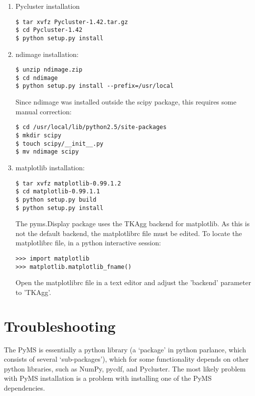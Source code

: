 \begin{enumerate}
\item Pycluster installation

\begin{verbatim}
$ tar xvfz Pycluster-1.42.tar.gz
$ cd Pycluster-1.42
$ python setup.py install
\end{verbatim}

\item ndimage installation:

\begin{verbatim}
$ unzip ndimage.zip
$ cd ndimage
$ python setup.py install --prefix=/usr/local
\end{verbatim}

\noindent
Since ndimage was installed outside the scipy package, this requires some manual
correction:

\begin{verbatim}
$ cd /usr/local/lib/python2.5/site-packages
$ mkdir scipy
$ touch scipy/__init__.py
$ mv ndimage scipy
\end{verbatim}

\item matplotlib installation:

\begin{verbatim}
$ tar xvfz matplotlib-0.99.1.2
$ cd matplotlib-0.99.1.1
$ python setup.py build
$ python setup.py install
\end{verbatim}

\noindent
The pyms.Display package uses the TKAgg backend for matplotlib. As this is
not the default backend, the matplotlibrc file must be edited. To locate the
matplotlibrc file, in a python interactive session:

\begin{verbatim}
>>> import matplotlib
>>> matplotlib.matplotlib_fname()
\end{verbatim}

\noindent
Open the matplotlibrc file in a text editor and adjust the 'backend'
parameter to 'TKAgg'.

\end{enumerate}

\section{Troubleshooting}

The PyMS is essentially a python library (a `package' in python parlance, which
consists of several `sub-packages'), which for some functionality depends on
other python libraries, such as NumPy, pycdf, and Pycluster. The most likely
problem with PyMS installation is a problem with installing one of the PyMS
dependencies.

